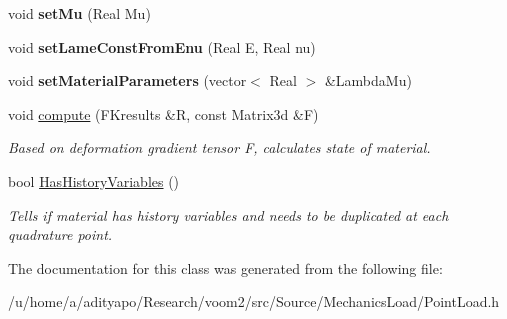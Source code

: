 \begin{DoxyCompactItemize}
\item 
\hypertarget{classvoom_1_1_point_load_a7dd8de114919a5428ed5692b149ee40a}{
void {\bfseries setMu} (Real Mu)}
\label{classvoom_1_1_point_load_a7dd8de114919a5428ed5692b149ee40a}

\item 
\hypertarget{classvoom_1_1_point_load_a85890bff5831fb2db22f6b271b8b4f1b}{
void {\bfseries setLameConstFromEnu} (Real E, Real nu)}
\label{classvoom_1_1_point_load_a85890bff5831fb2db22f6b271b8b4f1b}

\item 
\hypertarget{classvoom_1_1_point_load_a5718133ac6b9516e4050f20bf7352497}{
void {\bfseries setMaterialParameters} (vector$<$ Real $>$ \&LambdaMu)}
\label{classvoom_1_1_point_load_a5718133ac6b9516e4050f20bf7352497}

\item 
\hypertarget{classvoom_1_1_point_load_a0fc8a93dd23d399b06f4f58df3a69fe0}{
void \hyperlink{classvoom_1_1_point_load_a0fc8a93dd23d399b06f4f58df3a69fe0}{compute} (FKresults \&R, const Matrix3d \&F)}
\label{classvoom_1_1_point_load_a0fc8a93dd23d399b06f4f58df3a69fe0}

\begin{DoxyCompactList}\small\item\em Based on deformation gradient tensor F, calculates state of material. \item\end{DoxyCompactList}\item 
\hypertarget{classvoom_1_1_point_load_aec5de28848938c0e6ffcb86aaa9c6b3b}{
bool \hyperlink{classvoom_1_1_point_load_aec5de28848938c0e6ffcb86aaa9c6b3b}{HasHistoryVariables} ()}
\label{classvoom_1_1_point_load_aec5de28848938c0e6ffcb86aaa9c6b3b}

\begin{DoxyCompactList}\small\item\em Tells if material has history variables and needs to be duplicated at each quadrature point. \item\end{DoxyCompactList}\end{DoxyCompactItemize}


The documentation for this class was generated from the following file:\begin{DoxyCompactItemize}
\item 
/u/home/a/adityapo/Research/voom2/src/Source/MechanicsLoad/PointLoad.h\end{DoxyCompactItemize}
